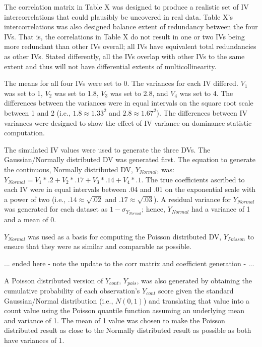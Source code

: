 \documentclass[ShortAfour,times,sageapa]{sagej}
\begin{document}
	\smallskip
	
	The correlation matrix in Table X was designed to produce a realistic set of IV intercorrelations that could plausibly be uncovered in real data.  
	Table X's intercorrelations was also designed balance extent of redundancy between the four IVs.  
	That is, the correlations in Table X do not result in one or two IVs being more redundant than other IVs overall; all IVs have equivalent total redundancies as other IVs.  
	Stated differently, all the IVs overlap with other IVs to the same extent and thus will not have differential extents of multicollinearity.
	
	The means for all four IVs were set to 0.  
	The variances for each IV differed. $V_1$ was set to 1, $V_2$ was set to 1.8, $V_3$ was set to 2.8, and $V_4$ was set to 4.
	The differences between the variances were in equal intervals on the square root scale between 1 and 2 (i.e., $1.8 \approx 1.33^2$ and $2.8 \approx 1.67^2$).
	The differences between IV variances were designed to show the effect of IV variance on dominance statistic computation.
	
	The simulated IV values were used to generate the three DVs.  
	The Gaussian/Normally distributed DV was generated first. 
	The equation to generate the continuous, Normally distributed DV, $Y_{Normal}$, was: $Y_{Normal} = V_1*.2 + V_2*.17 + V_3*.14 + V_4*.1$.  
	The true coefficients ascribed to each IV were in equal intervals between .04 and .01 on the exponential scale with a power of two (i.e., $.14 \approx \sqrt{.02}$ and $.17 \approx \sqrt{.03}$).
	A residual variance for $Y_{Normal}$ was generated for each dataset as $1 - \sigma_{Y_{Normal}}$; hence, $Y_{Normal}$ had a variance of 1 and a mean of 0. 
	
	$Y_{Normal}$ was used as a basis for computing the Poisson distributed DV, $Y_{Poisson}$ to ensure that they were as similar and comparable as possible.
	
	... ended here - note the update to the corr matrix and coefficient generation - ...
	
	
	A Poisson distributed version of $Y_{cont}$, $Y_{pois}$, was also generated by obtaining the cumulative probability of each observation's $Y_{cont}$ score given the standard Gaussian/Normal distribution (i.e., $N(0,1)$) and translating that value into a count value using the Poisson quantile function assuming an underlying mean and variance of 1.  
	The mean of 1 value was chosen to make the Poisson distributed result as close to the Normally distributed result as possible as both have variances of 1.	
	
\end{document}
